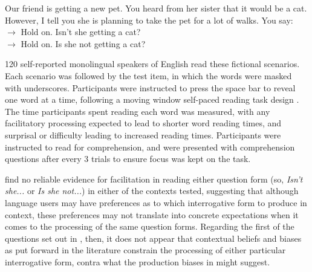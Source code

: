 \documentclass[output=paper,colorlinks,citecolor=brown]{langscibook}
\begin{document}
\begin{exe}
\ex \label{cat} Our friend is getting a new pet. You heard from her sister that it would be a cat. However, I tell you she is planning to take the pet for a lot of walks. You say:\\
$\longrightarrow$ Hold on. Isn't she getting a cat?\\
$\longrightarrow$ Hold on. Is she not getting a cat?
\end{exe}

120 self-reported monolingual speakers of English read these fictional scenarios. Each scenario was followed by the test item, in which the words were masked with underscores. Participants were instructed to press the space bar to reveal one word at a time, following a moving window self-paced reading task design \citep{Just1982}. The time participants spent reading each word was measured, with any facilitatory processing expected to lead to shorter word reading times, and surprisal or difficulty leading to increased reading times. Participants were instructed to read for comprehension, and were presented with comprehension questions after every 3 trials to ensure focus was kept on the task.

\citet{macuch_processing_inprep} find no reliable evidence for facilitation in reading either question form (so, \textit{Isn't she...} or \textit{Is she not...}) in either of the contexts tested, suggesting that although language users may have preferences as to which interrogative form to produce in context, these preferences may not translate into concrete expectations when it comes to the processing of the same question forms. Regarding the first of the questions set out in , then, it does not appear that contextual beliefs and biases as put forward in the literature constrain the processing of either particular interrogative form, contra what the production biases in \citet{domaneschi_bias_2017} might suggest.
\end{document}
